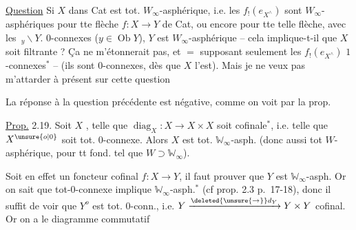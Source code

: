 
\uline{Question} Si $X$ dans Cat est tot. $W_\infty$-asphérique, i.e. les $f_!(e_{X^\wedge})$ sont $W_\infty$-asphériques pour tte flèche $f:X\to Y$ de Cat, ou encore pour tte telle flèche, avec les $\,{}_{y}\backslash Y$. $0$-connexes ($y\in\operatorname{Ob}Y$), $Y$ est $W_\infty$-asphérique -- cela implique-t-il que $X$ soit  filtrante ? Ça ne m'étonnerait pas, et $=$  supposant seulement les $f_!(e_{X^\wedge})$ $1$-connexes$^*$ -- (ils sont $0$-connexes, dès que $X$ l'est). Mais je ne veux pas m'attarder à présent sur cette question\unsure{\ldots}

\reversemarginpar{}\normalmarginpar

\reversemarginpar{}\normalmarginpar

La réponse à la question précédente est négative, comme on voit par la prop.

\reversemarginpar{}\normalmarginpar

\uline{Prop.} 2.19. Soit $X$  , telle que $\operatorname{diag}_X:X\to X\times X$ soit cofinale$^*$, i.e. telle que $X^{\unsure{o|0}}$ soit tot. $0$-connexe. Alors $X$ est tot. $\mathbb W_\infty$-asph. (donc aussi tot $W$-asphérique, pour tt  fond.  tel que $W\supset\mathbb W_\infty$).

Soit en effet un foncteur cofinal $f:X\to Y$, il faut prouver que $Y$ est $\mathbb W_\infty$-asph. Or on sait que tot-$0$-connexe implique $\mathbb W_\infty$-asph.$^*$ (cf prop. 2.3 p.~17-18), donc il suffit de voir que $Y^o$ est tot. $0$-conn., i.e. $Y\xrightarrow{\deleted{\unsure{\to}}d_Y}Y\times Y$ cofinal. Or on a le diagramme commutatif

\reversemarginpar{}\normalmarginpar


